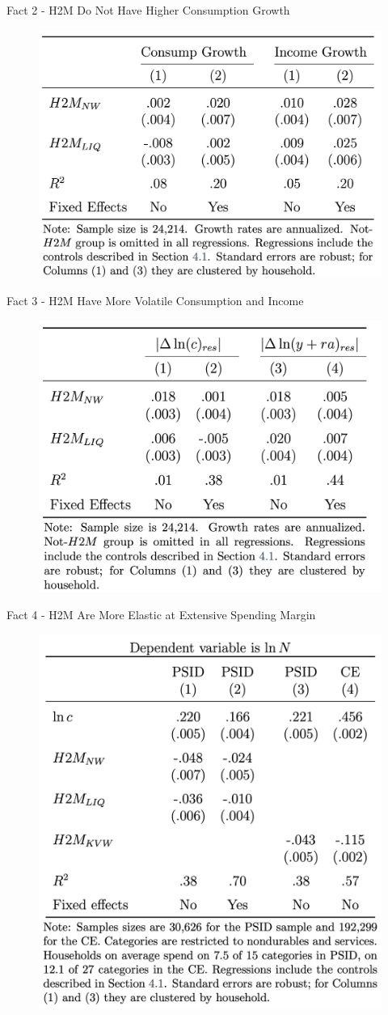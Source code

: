 \documentclass{beamer}
\begin{document}
\begin{frame}{Fact 2 - 
	H2M Do Not Have Higher Consumption Growth}
	\label{fact2}
	\begin{figure}
		\centering
		\includegraphics[width=0.7\linewidth]{Figures/Table4.png}
	\end{figure}

\hyperlink{canonical}{}
\end{frame}
\begin{frame}{Fact 3 - H2M Have More Volatile Consumption and Income}
	\label{fact3}
	\begin{figure}
		\centering
		\includegraphics[width=0.7\linewidth]{Figures/Table5.png}
	\end{figure}
\end{frame}

\begin{frame}{Fact 4 - H2M Are More Elastic at Extensive Spending Margin}
	\label{fact4}
	\begin{figure}
		\centering
		\includegraphics[width=0.5\linewidth]{Figures/Table6.png}
	\end{figure}
\end{frame}
\end{document}

